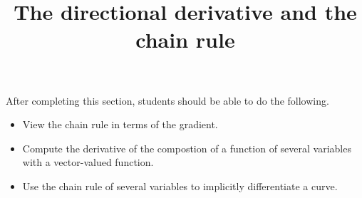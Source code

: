 \documentclass{ximera}
\title{The directional derivative and the chain rule}
\begin{document}
\begin{abstract}
\end{abstract}

\maketitle

\begin{sectionOutcomes}

After completing this section, students should be able to do the following.

\begin{itemize}
\item View the chain rule in terms of the gradient.
\item Compute the derivative of the compostion of a function of
  several variables with a vector-valued function.
\item Use the chain rule of several variables to implicitly
  differentiate a curve.
\end{itemize}

\end{sectionOutcomes}
\end{document}
